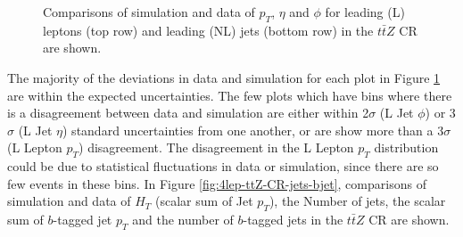 \begin{figure}[htbp]
\begin{tabular}{ccc}
  \end{tabular}
    \caption{Comparisons of simulation and data of $p_{T}$, $\eta$ and $\phi$ for leading (L) leptons (top row) and leading (NL) jets (bottom row) in the $t\bar{t}Z$ CR are shown.}\label{fig:4lep-ttZ-CR-leptonPlots}
\end{figure}
The majority of the deviations in data and simulation for each plot in Figure \ref{fig:4lep-ttZ-CR-leptonPlots} are within the expected uncertainties. The few plots which have bins where there is a disagreement between data and simulation are either within 2$\sigma$ (L Jet $\phi$) or 3$\sigma$ (L Jet $\eta$) standard uncertainties from one another, or are show more than a 3$\sigma$ (L Lepton $p_{T}$) disagreement. The disagreement in the L Lepton $p_{T}$ distribution could be due to statistical fluctuations in data or simulation, since there are so few events in these bins. In Figure \ref{fig:4lep-ttZ-CR-jets-bjet}, comparisons of simulation and data of $H_{T}$ (scalar sum of Jet $p_{T}$), the Number of jets, the scalar sum of $b$-tagged jet $p_{T}$ and the number of $b$-tagged jets in the $t\bar{t}Z$ CR are shown.



